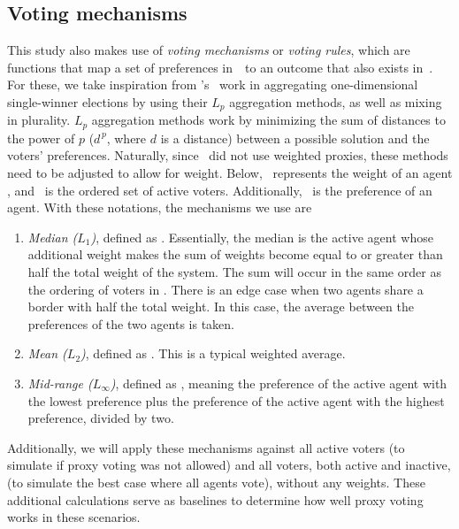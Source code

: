 \subsection{Voting mechanisms}\label{subsec:voting-mechanisms}
This study also makes use of \textit{voting mechanisms} or \textit{voting rules},
which are functions that map a set of preferences in~\systemspace\ to an outcome that
also exists in~\systemspace.
For these, we take inspiration from 's~\cite{Bulteau2021} work in
aggregating one-dimensional single-winner elections by using their $L_p$ aggregation
methods, as well as mixing in plurality.
$L_p$ aggregation methods work by minimizing the sum of distances to the power of $p$
($d^{\,p}$, where $d$ is a distance) between a possible solution and the voters'
preferences.
Naturally, since~\cite{Bulteau2021} did not use weighted proxies, these methods need
to be adjusted to allow for weight.
Below, \agentweight\ represents the weight of an agent \agent, and \systemproxies\ is
the ordered set of active voters.
Additionally, \agenttruth\ is the preference of an agent.
With these notations, the mechanisms we use are
\begin{enumerate}
    \item {
        \textit{Median ($L_1$)}, defined as
        $$.
        Essentially, the median is the active agent whose additional weight makes the
        sum of weights become equal to or greater than half the total weight of the
        system.
        The sum will occur in the same order as the ordering of voters in
        \systemproxies.
        There is an edge case when two agents share a border   with half the total weight.
        In this case, the average between the preferences of the two agents is taken.
    }
    \item {
        \textit{Mean ($L_2$)}, defined as
        $$.
        This is a typical weighted average.
    }
    \item {
        \textit{Mid-range ($L_\infty$)}, defined as
        $$, meaning the preference
        of the active agent with the lowest preference plus the preference of the
        active agent with the highest preference, divided by two.
    }
\end{enumerate}
Additionally, we will apply these mechanisms against   all active voters (to simulate
if proxy voting was not allowed) and all voters, both active and inactive, (to simulate
the best case where all agents vote), without any weights.
These additional calculations serve as baselines to determine how well proxy voting
works in these scenarios.

